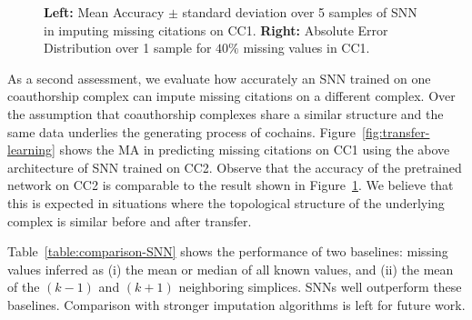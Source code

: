 \begin{figure}[htbp]
  \centering
\caption{\textbf{Left:} Mean Accuracy $\pm$ standard deviation over 5 samples of SNN in imputing missing citations on CC1. \textbf{Right:} Absolute Error Distribution over 1 sample for $40\%$ missing values in CC1.}
\label{fig:accuracy-error}
\end{figure}


As a second assessment, we evaluate how accurately an SNN trained on one coauthorship complex can impute missing citations on a different complex. Over the assumption that coauthorship complexes share a similar structure and the same data underlies the generating process of cochains.
Figure~\ref{fig:transfer-learning} shows the MA in predicting missing citations on CC1 using the above architecture of SNN trained on CC2. Observe that the accuracy of the pretrained network on CC2 is comparable to the result shown in Figure~\ref{fig:accuracy-error}. We believe that this is expected in situations where the topological structure of the underlying complex is similar before and after transfer.

Table~\ref{table:comparison-SNN} shows the performance of two baselines: missing values inferred as (i) the mean or median of all known values, and (ii) the mean of the $(k-1)$ and $(k+1)$ neighboring simplices.
SNNs well outperform these baselines.
Comparison with stronger imputation algorithms is left for future work.

